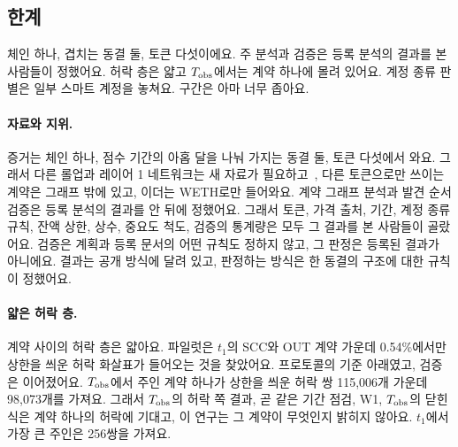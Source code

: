 \subsection{한계}

\begin{yoji}
체인 하나, 겹치는 동결 둘, 토큰 다섯이에요. 주 분석과 검증은 등록 분석의 결과를 본 사람들이 정했어요. 허락 층은 얇고 $T_{\mathrm{obs}}$에서는 계약 하나에 몰려 있어요. 계정 종류 판별은 일부 스마트 계정을 놓쳐요. 구간은 아마 너무 좁아요.
\end{yoji}

\paragraph{자료와 지위.}
증거는 체인 하나, 점수 기간의 아홉 달을 나눠 가지는 동결 둘, 토큰 다섯에서 와요. 그래서 다른 롤업과 레이어 1 네트워크는 새 자료가 필요하고~\cite{werner2022sok}, 다른 토큰으로만 쓰이는 계약은 그래프 밖에 있고, 이더는 WETH로만 들어와요. 계약 그래프 분석과 발견 순서 검증은 등록 분석의 결과를 안 뒤에 정했어요. 그래서 토큰, 가격 출처, 기간, 계정 종류 규칙, 잔액 상한, 상수, 중요도 척도, 검증의 통계량은 모두 그 결과를 본 사람들이 골랐어요. 검증은 계획과 등록 문서의 어떤 규칙도 정하지 않고, 그 판정은 등록된 결과가 아니에요. 결과는 공개 방식에 달려 있고, 판정하는 방식은 한 동결의 구조에 대한 규칙이 정했어요.

\paragraph{얇은 허락 층.}
계약 사이의 허락 층은 얇아요. 파일럿은 $t_1$의 SCC와 OUT 계약 가운데 0.54\%에서만 상한을 씌운 허락 화살표가 들어오는 것을 찾았어요. 프로토콜의 기준 아래였고, 검증은 이어졌어요. $T_{\mathrm{obs}}$에서 주인 계약 하나가 상한을 씌운 허락 쌍 115,006개 가운데 98,073개를 가져요. 그래서 $T_{\mathrm{obs}}$의 허락 쪽 결과, 곧 같은 기간 점검, W1, $T_{\mathrm{obs}}$의 닫힌 식은 계약 하나의 허락에 기대고, 이 연구는 그 계약이 무엇인지 밝히지 않아요. $t_1$에서 가장 큰 주인은 256쌍을 가져요.

